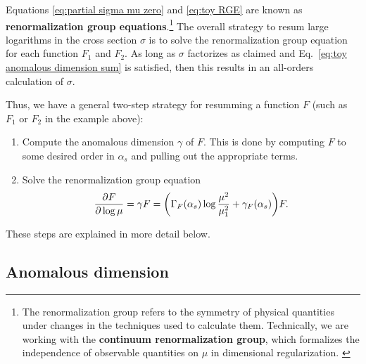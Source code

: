 \documentclass[12pt,twoside,class=../reedthesis, crop=false]{standalone}
\begin{document}
	Equations \ref{eq:partial sigma mu zero} and \ref{eq:toy RGE} are known as \textbf{renormalization group equations}.\footnote{The renormalization group refers to the symmetry of physical quantities under changes in the techniques used to calculate them. Technically, we are working with the \textbf{continuum renormalization group}, which formalizes the independence of observable quantities on $\mu$ in dimensional regularization. \cite{schwartz_quantum_2014}} The overall strategy to resum large logarithms in the cross section $\sigma$ is to solve the renormalization group equation for each function $F_1$ and $F_2$. As long as $\sigma$ factorizes as claimed and Eq.~\ref{eq:toy anomalous dimension sum} is satisfied, then this results in an all-orders calculation of $\sigma$.

	Thus, we have a general two-step strategy for resumming a function $F$ (such as $F_1$ or $F_2$ in the example above):
	\begin{enumerate}
		\item Compute the anomalous dimension $\gamma$ of $F$. This is done by computing $F$ to some desired order in $\alpha_s$ and pulling out the appropriate terms. 

		\item Solve the renormalization group equation
		\begin{equation}\label{eq:general RGE}
			\frac{\partial F}{\partial \log \mu} = \gamma F = \qty(\Gamma_F(\alpha_s) \log\frac{\mu^2}{\mu_1^2} + \gamma_F(\alpha_s))F.
		\end{equation}
	\end{enumerate}
	These steps are explained in more detail below.

\subsection{Anomalous dimension}
\end{document}
